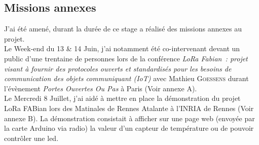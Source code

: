 \documentclass{article}
\begin{document}
\subsection{Missions annexes}
J'ai été amené, durant la durée de ce stage a réalisé des missions annexes au projet.\\
Le Week-end du 13 \& 14 Juin, j'ai notamment été co-intervenant devant un public d'une trentaine de personnes lors de la conférence \emph{LoRa Fabian~:  projet visant à fournir des protocoles ouverts et standardisés pour les besoins de communication des objets communiquant (IoT)} avec Mathieu \textsc{Goessens} durant l'évènement \emph{Portes Ouvertes Ou Pas} à Paris (Voir annexe A).\\
Le Mercredi 8 Juillet, j'ai aidé à mettre en place la démonstration du projet LoRa FABian lors des Matinales de Rennes Atalante à l'\textsc{INRIA} de Rennes (Voir annexe B). La démonstration consistait à afficher sur une page web (envoyée par la carte Arduino via radio) la valeur d'un capteur de température ou de pouvoir contrôler une led.\\
\end{document}
